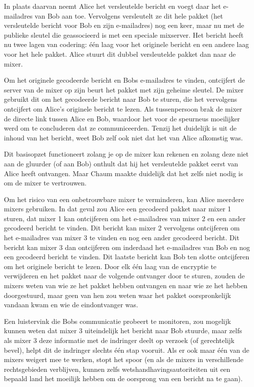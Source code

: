 \documentclass[
  a5paper,
  smalldemyvopaper,11pt,twoside,onecolumn,openright,extrafontsizes,
hidelinks]{memoir}
\begin{document}
In plaats daarvan neemt Alice het versleutelde bericht en voegt daar het
e-mailadres van Bob aan toe. Vervolgens versleutelt ze dit hele pakket
(het versleutelde bericht voor Bob en zijn e-mailadres) nog een keer,
maar nu met de publieke sleutel die geassocieerd is met een speciale
mixserver. Het bericht heeft nu twee lagen van codering: één laag voor
het originele bericht en een andere laag voor het hele pakket. Alice
stuurt dit dubbel versleutelde pakket dan naar de mixer.

Om het originele gecodeerde bericht en Bobs e-mailadres te vinden,
ontcijfert de server van de mixer op zijn beurt het pakket met zijn
geheime sleutel. De mixer gebruikt dit om het gecodeerde bericht naar
Bob te sturen, die het vervolgens ontcijfert om Alice's originele
bericht te lezen. Als tussenpersoon brak de mixer de directe link tussen
Alice en Bob, waardoor het voor de speurneus moeilijker werd om te
concluderen dat ze communiceerden. Tenzij het duidelijk is uit de inhoud
van het bericht, weet Bob zelf ook niet dat het van Alice afkomstig was.

Dit basisopzet functioneert zolang je op de mixer kan rekenen en zolang
deze niet aan de gluurder (of aan Bob) onthult dat hij het versleutelde
pakket eerst van Alice heeft ontvangen. Maar Chaum maakte duidelijk dat
het zelfs niet nodig is om de mixer te vertrouwen.

Om het risico van een onbetrouwbare mixer te verminderen, kan Alice
meerdere mixers gebruiken. In dat geval zou Alice een gecodeerd pakket
naar mixer 1 sturen, dat mixer 1 kan ontcijferen om het e-mailadres van
mixer 2 en een ander gecodeerd bericht te vinden. Dit bericht kan mixer
2 vervolgens ontcijferen om het e-mailadres van mixer 3 te vinden en nog
een ander gecodeerd bericht. Dit bericht kan mixer 3 dan ontcijferen om
inderdaad het e-mailadres van Bob en nog een gecodeerd bericht te
vinden. Dit laatste bericht kan Bob ten slotte ontcijferen om het
originele bericht te lezen. Door elk één laag van de encryptie te
verwijderen en het pakket naar de volgende ontvanger door te sturen,
zouden de mixers weten van wie ze het pakket hebben ontvangen en naar
wie ze het hebben doorgestuurd, maar geen van hen zou weten waar het
pakket oorspronkelijk vandaan kwam en wie de eindontvanger was.

Een luistervink die Bobs communicatie probeert te monitoren, zou
mogelijk kunnen weten dat mixer 3 uiteindelijk het bericht naar Bob
stuurde, maar zelfs als mixer 3 deze informatie met de indringer deelt
op verzoek (of gerechtelijk bevel), helpt dit de indringer slechts één
stap vooruit. Als er ook maar één van de mixers weigert mee te werken,
stopt het spoor (en als de mixers in verschillende rechtsgebieden
verblijven, kunnen zelfs wetshandhavingsautoriteiten uit een bepaald
land het moeilijk hebben om de oorsprong van een bericht na te gaan).
\end{document}
